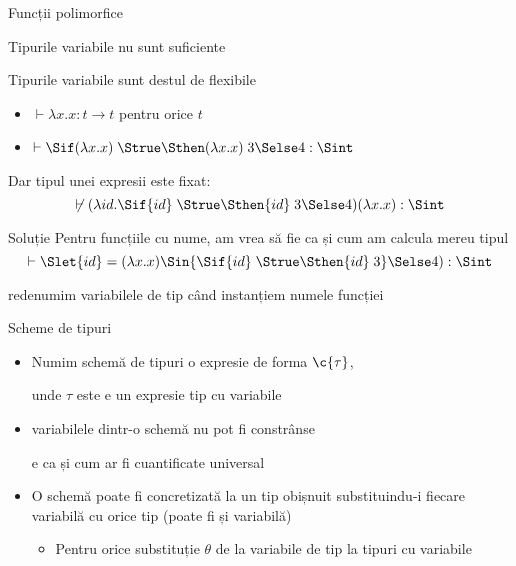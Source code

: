 \documentclass[xcolor=x11names,compress,10pt]{beamer}
\begin{document}
  \begin{section}{Funcții polimorfice}
    \begin{frame}{Tipurile variabile nu sunt suficiente}
      \begin{block}{Tipurile variabile sunt destul de flexibile}
      \begin{itemize}
        \item $\vdash {\lambda x . x} : t \rightarrow t$ pentru orice $t$
        \item $\vdash {\Sif (\lambda x.x)\; {\Strue} \Sthen (\lambda x. x)\; 3} \Selse 4 : \Sint$
      \end{itemize}
      \end{block}
      \pause 
      \begin{alertblock}{ Dar tipul unei expresii este fixat:}
       \[\not\vdash (\lambda {id}. {\Sif {id}\; {\Strue} \Sthen {id}\; 3} \Selse 4) (\lambda x. x) : \Sint\]
      \end{alertblock}
      \pause
      \begin{block}{Soluție}
        Pentru funcțiile cu nume, am vrea să fie ca și cum am calcula mereu tipul
       \[\vdash \Slet {id} = (\lambda x. x) \Sin {\Sif {id}\; {\Strue} \Sthen {id}\; 3} \Selse 4)  : \Sint\]

        redenumim variabilele de tip când instanțiem numele funcției

      \end{block}
      
    \end{frame}

    \begin{frame}{Scheme de tipuri}
      \begin{itemize}
        \item Numim schemă de tipuri o expresie de forma $\c{\tau}$,
         
        unde $\tau$ este e un expresie tip  cu variabile

        \item variabilele dintr-o schemă nu pot fi constrânse 
        
        e ca și cum ar fi cuantificate universal

        \item O schemă poate fi concretizată la un tip obișnuit
        substituindu-i fiecare variabilă cu orice tip (poate fi și variabilă)

        \begin{itemize}
          \item Pentru orice substituție $\theta$ de la variabile de tip la tipuri cu variabile
        \end{itemize}
      \end{itemize}
    \end{frame}



\end{section}
\end{document}
